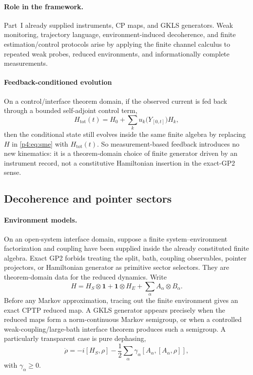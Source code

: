 \documentclass[12pt,a4paper]{article}
\begin{document}
\paragraph{Role in the framework.}
Part~I already supplied instruments, CP maps, and GKLS generators.
Weak monitoring, trajectory language, environment-induced decoherence, and finite estimation/control protocols arise by applying the finite channel calculus to repeated weak probes, reduced environments, and informationally complete measurements.



\paragraph{Feedback-conditioned evolution}
\label{p4:sec:part3-feedback}

On a control/interface theorem domain, if the observed current is fed back through a bounded self-adjoint control term,
\begin{equation}
\label{p4:eq:feedback-H}
H_{\mathrm{tot}}(t)=H_0+\sum_k u_k\!\bigl(Y_{[0,t]}\bigr)H_k,
\end{equation}
then the conditional state still evolves inside the same finite algebra by replacing $H$ in \eqref{p4:eq:sme} with $H_{\mathrm{tot}}(t)$.
So measurement-based feedback introduces no new kinematics: it is a theorem-domain choice of finite generator driven by an instrument record, not a constitutive Hamiltonian insertion in the exact-GP2 sense.



\subsection[Environment-induced decoherence and pointer sectors]
{Decoherence and pointer sectors}
\label{p4:sec:part3-decoherence}

\paragraph{Environment models.}
On an open-system interface domain, suppose a finite system--environment factorization and coupling have been supplied inside the already constituted finite algebra.  Exact GP2 forbids treating the split, bath, coupling observables, pointer projectors, or Hamiltonian generator as primitive sector selectors.  They are theorem-domain data for the reduced dynamics.  Write
\begin{equation}
\label{p4:eq:sys-env-H}
H = H_S\otimes \mathbf 1 + \mathbf 1\otimes H_E + \sum_{\alpha} A_{\alpha}\otimes B_{\alpha}.
\end{equation}
Before any Markov approximation, tracing out the finite environment gives an
exact CPTP reduced map.  A GKLS generator appears precisely when the reduced
maps form a norm-continuous Markov semigroup, or when a controlled
weak-coupling/large-bath interface theorem produces such a semigroup.  A
particularly transparent case is pure dephasing,
\begin{equation}
\label{p4:eq:pure-dephasing}
\dot\rho = -i[H_S,\rho]-\frac12\sum_{\alpha}\gamma_{\alpha}[A_{\alpha},[A_{\alpha},\rho]],
\end{equation}
with $\gamma_{\alpha}\ge0$.
\end{document}
